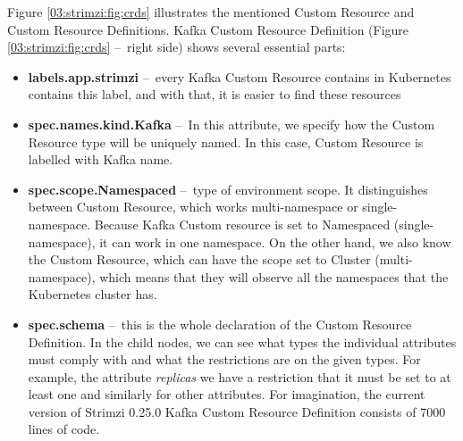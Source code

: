 Figure \ref{03:strimzi:fig:crds} illustrates the mentioned Custom Resource and Custom Resource Definitions. Kafka Custom Resource Definition (Figure \ref{03:strimzi:fig:crds} \---\ right side) shows several essential parts:
\begin{itemize}[itemsep=1mm, parsep=0pt]
    \item \textbf{labels.app.strimzi}  \---\ every Kafka Custom Resource contains in Kubernetes contains this label, and with that, it is easier to find these resources
    \item \textbf{spec.names.kind.Kafka} \---\ In this attribute, we specify how the Custom Resource type will be uniquely named. In this case, Custom Resource is labelled with Kafka name.
    \item \textbf{spec.scope.Namespaced} \---\ type of environment scope. It distinguishes between Custom Resource, which works multi-namespace or single-namespace. Because Kafka Custom resource is set to Namespaced (single-namespace), it can work in one namespace. On the other hand, we also know the Custom Resource, which can have the scope set to Cluster (multi-namespace), which means that they will observe all the namespaces that the Kubernetes cluster has.
    \item \textbf{spec.schema} \---\ this is the whole declaration of the Custom Resource Definition. In the child nodes, we can see what types the individual attributes must comply with and what the restrictions are on the given types. For example, the attribute \emph{replicas} we have a restriction that it must be set to at least one and similarly for other attributes. For imagination, the current version of Strimzi 0.25.0 Kafka Custom Resource Definition consists of 7000 lines of code.
\end{itemize}

